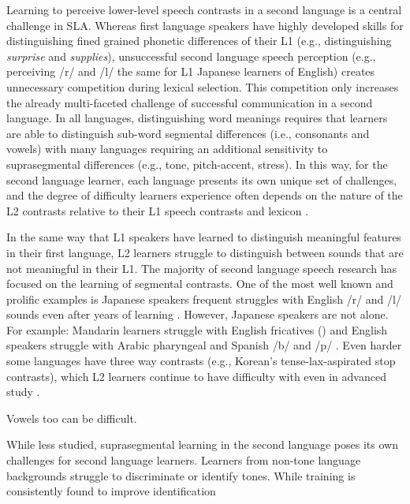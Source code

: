 Learning to perceive lower-level speech contrasts in a second language is a central challenge in SLA. Whereas first language speakers have highly developed skills for distinguishing fined grained phonetic differences of their L1 (e.g., distinguishing \textit{surprise} and \textit{supplies}), unsuccessful second language speech perception (e.g., perceiving /r/ and /l/ the same for L1 Japanese learners of English) creates unnecessary competition during lexical selection. This competition only increases the already multi-faceted challenge of successful communication in a second language. In all languages, distinguishing word meanings requires that learners are able to distinguish sub-word segmental differences (i.e., consonants and vowels) with many languages requiring an additional sensitivity to suprasegmental differences (e.g., tone, pitch-accent, stress). In this way, for the second language learner, each language presents its own unique set of challenges, and the degree of difficulty learners experience often depends on the nature of the L2 contrasts relative to their L1 speech contrasts and lexicon \parencite{Flege1995,Best1995,BestTyler2007,vanLeussenEscudero2015}. 

In the same way that L1 speakers have learned to distinguish meaningful features in their first language, L2 learners struggle to distinguish between sounds that are not meaningful in their L1. The majority of second language speech research has focused on the learning of segmental contrasts. One of the most well known and prolific examples is Japanese speakers frequent struggles with English /r/ and /l/ sounds even after years of learning \parencite{Brown2000}. However, Japanese speakers are not alone. For example: Mandarin learners struggle with English fricatives () \cite{Wiener2022} and English speakers struggle with Arabic pharyngeal \cite{Burnham2013} and Spanish /b/ and /p/ \cite{Nagle2022}. Even harder some languages have three way contrasts (e.g., Korean's tense-lax-aspirated stop contrasts), which L2 learners continue to have difficulty with even in advanced study \cite{Kim2023}. 

Vowels too can be difficult. 

While less studied, suprasegmental learning in the second language poses its own challenges for second language learners. Learners from non-tone language backgrounds struggle to discriminate or identify tones. While training is consistently found to improve identification 

